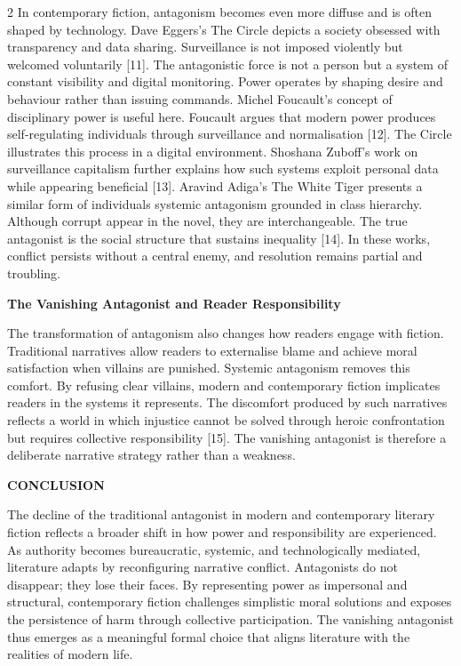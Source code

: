 \documentclass[12pt,a4paper]{article}
\begin{document}
\begin{multicols}{2}
\noindent
In contemporary fiction, antagonism becomes even more 
diffuse and is often shaped by technology. Dave Eggers’s The 
Circle depicts a society obsessed with transparency and data 
sharing. Surveillance is not imposed violently but welcomed 
voluntarily [11]. 
The antagonistic force is not a person but a system of constant 
visibility and digital monitoring. Power operates by shaping 
desire and behaviour rather than issuing commands. 
Michel Foucault’s concept of disciplinary power is useful here. 
Foucault argues that modern power produces self-regulating 
individuals through surveillance and normalisation [12]. The 
Circle illustrates this process in a digital environment. Shoshana 
Zuboff’s work on surveillance capitalism further explains how 
such systems exploit personal data while appearing beneficial 
[13]. 
Aravind Adiga’s The White Tiger presents a similar form of 
individuals 
systemic antagonism grounded in class hierarchy. Although 
corrupt 
appear in the novel, they are 
interchangeable. The true antagonist is the social structure that 
sustains inequality [14]. In these works, conflict persists without a central enemy, and resolution remains partial and 
troubling.

\vspace{8pt}
\noindent
\textbf{The Vanishing Antagonist and Reader Responsibility }

\noindent
The transformation of antagonism also changes how readers 
engage with fiction. Traditional narratives allow readers to 
externalise blame and achieve moral satisfaction when villains 
are punished. Systemic antagonism removes this comfort. 
By refusing clear villains, modern and contemporary fiction 
implicates readers in the systems it represents. The discomfort 
produced by such narratives reflects a world in which injustice 
cannot be solved through heroic confrontation but requires 
collective responsibility [15].
The vanishing antagonist is therefore a deliberate narrative 
strategy rather than a weakness.

\vspace{8pt}
\noindent
\textcolor{journalblue}{\textbf{CONCLUSION}}

\noindent
The decline of the traditional antagonist in modern and 
contemporary literary fiction reflects a broader shift in how 
power and responsibility are experienced. As authority becomes 
bureaucratic, systemic, and technologically mediated, literature 
adapts by reconfiguring narrative conflict. Antagonists do not 
disappear; they lose their faces. By representing power as 
impersonal and structural, contemporary fiction challenges 
simplistic moral solutions and exposes the persistence of harm 
through collective participation. The vanishing antagonist thus 
emerges as a meaningful formal choice that aligns literature 
with the realities of modern life.


\end{multicols}
\end{document}
